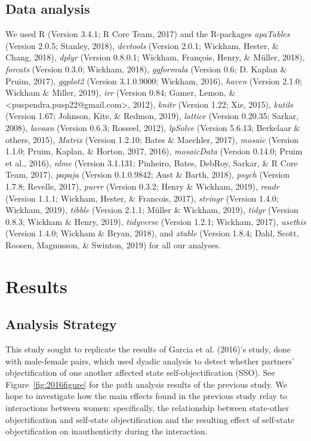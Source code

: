 \documentclass[man]{apa6}
\begin{document}
\subsection{Data analysis}\label{data-analysis}

We used R (Version 3.4.1; R Core Team, 2017) and the R-packages
\emph{apaTables} (Version 2.0.5; Stanley, 2018), \emph{devtools}
(Version 2.0.1; Wickham, Hester, \& Chang, 2018), \emph{dplyr} (Version
0.8.0.1; Wickham, François, Henry, \& Müller, 2018), \emph{forcats}
(Version 0.3.0; Wickham, 2018), \emph{ggformula} (Version 0.6; D. Kaplan
\& Pruim, 2017), \emph{ggplot2} (Version 3.1.0.9000; Wickham, 2016),
\emph{haven} (Version 2.1.0; Wickham \& Miller, 2019), \emph{irr}
(Version 0.84; Gamer, Lemon, \&
\textless{}puspendra.pusp22@gmail.com\textgreater{}, 2012), \emph{knitr}
(Version 1.22; Xie, 2015), \emph{kutils} (Version 1.67; Johnson, Kite,
\& Redmon, 2019), \emph{lattice} (Version 0.20.35; Sarkar, 2008),
\emph{lavaan} (Version 0.6.3; Rosseel, 2012), \emph{lpSolve} (Version
5.6.13; Berkelaar \& others, 2015), \emph{Matrix} (Version 1.2.10; Bates
\& Maechler, 2017), \emph{mosaic} (Version 1.1.0; Pruim, Kaplan, \&
Horton, 2017, 2016), \emph{mosaicData} (Version 0.14.0; Pruim et al.,
2016), \emph{nlme} (Version 3.1.131; Pinheiro, Bates, DebRoy, Sarkar, \&
R Core Team, 2017), \emph{papaja} (Version 0.1.0.9842; Aust \& Barth,
2018), \emph{psych} (Version 1.7.8; Revelle, 2017), \emph{purrr}
(Version 0.3.2; Henry \& Wickham, 2019), \emph{readr} (Version 1.1.1;
Wickham, Hester, \& Francois, 2017), \emph{stringr} (Version 1.4.0;
Wickham, 2019), \emph{tibble} (Version 2.1.1; Müller \& Wickham, 2019),
\emph{tidyr} (Version 0.8.3; Wickham \& Henry, 2019), \emph{tidyverse}
(Version 1.2.1; Wickham, 2017), \emph{usethis} (Version 1.4.0; Wickham
\& Bryan, 2018), and \emph{xtable} (Version 1.8.4; Dahl, Scott, Roosen,
Magnusson, \& Swinton, 2019) for all our analyses.

\section{Results}\label{results}

\subsection{Analysis Strategy}\label{analysis-strategy}

This study sought to replicate the results of Garcia et al. (2016)'s
study, done with male-female pairs, which used dyadic analysis to detect
whether partners' objectification of one another affected state
self-objectification (SSO). See Figure~\ref{fig:2016figure} for the path
analysis results of the previous study. We hope to investigate how the
main effects found in the previous study relay to interactions between
women: specifically, the relationship between state-other
objectification and self-state objectification and the resulting effect
of self-state objectification on inauthenticity during the interaction.
\end{document}
